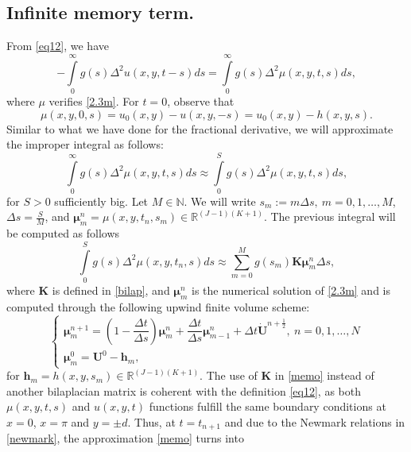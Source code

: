 \documentclass[12pt]{article}
\numberwithin{equation}{section}
\begin{document}
\subsection{Infinite memory term.}
From \eqref{eq12}, we have
\[
-\int\limits_0^\infty g(s) \Delta^2u(x,y,t-s)ds = \int\limits_0^\infty g(s)\Delta^2\mu(x,y,t,s)ds,
\]
where $\mu$ verifies \eqref{2.3m}. For $t=0$, observe that
\[ \mu(x,y,0,s) = u_0(x,y)-u(x,y,-s) = u_0(x,y) - h(x,y,s).\]
Similar to what we have done for the fractional derivative, we will approximate the improper integral as follows:
\[
\int\limits_0^\infty g(s)\Delta^2\mu(x,y,t,s)ds \approx \int\limits_0^S g(s)\Delta^2\mu(x,y,t,s)ds,
\]
for $S>0$ sufficiently big. Let $M\in\mathbb{N}$. We will write $s_m := m\Delta s,\: m=0,1,\dots,M$, $\Delta s = \frac{S}{M}$, and $\boldsymbol{\mu}_m^n = \mu(x,y,t_n,s_m) \in \mathbb{R}^{(J-1)(K+1)}$. The previous integral will be computed as follows
\begin{equation}\label{memo}
\int\limits_0^S g(s)\Delta^2\mu(x,y,t_n,s)ds \approx \sum\limits_{m=0}^M g(s_m) \boldsymbol{K} \boldsymbol{\mu}_m^n \Delta s,
\end{equation}
where $\boldsymbol{K}$ is defined in \eqref{bilap}, and $\boldsymbol{\mu}_m^n$ is the numerical solution of \eqref{2.3m} and is computed through the following upwind finite volume scheme: 
\begin{equation}\label{esq_mu}
\begin{cases}
    \boldsymbol{\mu}_{m}^{n+1} = \left(1-\dfrac{\Delta t}{\Delta s} \right)\boldsymbol{\mu}_{m}^{n} +\dfrac{\Delta t}{\Delta s}\boldsymbol{\mu}_{m-1}^{n} + \Delta t \boldsymbol{\dot{U}}^{n+\frac12},\: n=0,1,\dots,N \\
    \boldsymbol{\mu}_{m}^{0} = \boldsymbol{U}^0 - \boldsymbol{h}_m,
    \end{cases}
\end{equation}
for $\boldsymbol{h}_m = h(x,y,s_m) \in \mathbb{R}^{(J-1)(K+1)}$. The use of $\boldsymbol K$ in \eqref{memo} instead of another bilaplacian matrix is coherent with the definition \eqref{eq12}, as both $\mu(x,y,t,s)$ and $u(x,y,t)$ functions fulfill the same boundary conditions at $x =0$, $x=\pi$ and $y = \pm d$. Thus, at $t = t_{n+1}$ and due to the Newmark relations in \eqref{newmark}, the approximation \eqref{memo} turns into
\end{document}
